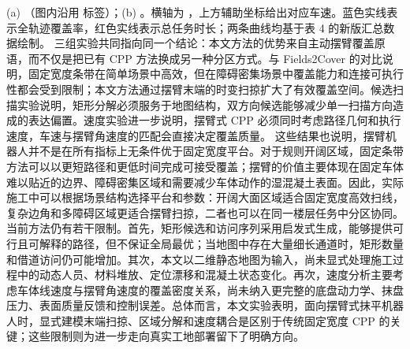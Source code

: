 {}\markdownRendererParagraphSeparator
{}\markdownRendererParagraphSeparator
{} (a) （图内沿用  标签）；(b) 。横轴为 ，上方辅助坐标给出对应车速。蓝色实线表示全轨迹覆盖率，红色实线表示总任务时长；两条曲线均基于表 4 的新版汇总数据绘制。\markdownRendererParagraphSeparator
{}
\markdownRendererSectionEnd \markdownRendererSectionBegin
{}\markdownRendererParagraphSeparator
{}三组实验共同指向同一个结论：本文方法的优势来自主动摆臂覆盖原语，而不仅是把已有 CPP 方法换成另一种分区方式。与 Fields2Cover 的对比说明，固定宽度条带在简单场景中高效，但在障碍密集场景中覆盖能力和连接可执行性都会受到限制；本文方法通过摆臂末端的时变扫掠扩大了有效覆盖空间。候选扫描实验说明，矩形分解必须服务于地图结构，双方向候选能够减少单一扫描方向造成的表达偏置。速度实验进一步说明，摆臂式 CPP 必须同时考虑路径几何和执行速度，车速与摆臂角速度的匹配会直接决定覆盖质量。\markdownRendererParagraphSeparator
{}这些结果也说明，摆臂机器人并不是在所有指标上无条件优于固定宽度平台。对于规则开阔区域，固定条带方法可以以更短路径和更低时间完成可接受覆盖；摆臂的价值主要体现在固定车体难以贴近的边界、障碍密集区域和需要减少车体动作的湿混凝土表面。因此，实际施工中可以根据场景结构选择平台和参数：开阔大面区域适合固定宽度高效扫线，复杂边角和多障碍区域更适合摆臂扫掠，二者也可以在同一楼层任务中分区协同。\markdownRendererParagraphSeparator
{}当前方法仍有若干限制。首先，矩形候选和访问序列采用启发式生成，能够提供可行且可解释的路径，但不保证全局最优；当地图中存在大量细长通道时，矩形数量和借道访问仍可能增加。其次，本文以二维静态地图为输入，尚未显式处理施工过程中的动态人员、材料堆放、定位漂移和混凝土状态变化。再次，速度分析主要考虑车体线速度与摆臂角速度的覆盖密度关系，尚未纳入更完整的底盘动力学、抹盘压力、表面质量反馈和控制误差。总体而言，本文实验表明，面向摆臂式抹平机器人时，显式建模末端扫掠、区域分解和速度耦合是区别于传统固定宽度 CPP 的关键；这些限制则为进一步走向真实工地部署留下了明确方向。
\markdownRendererSectionEnd 
\markdownRendererSectionEnd \markdownRendererDocumentEnd